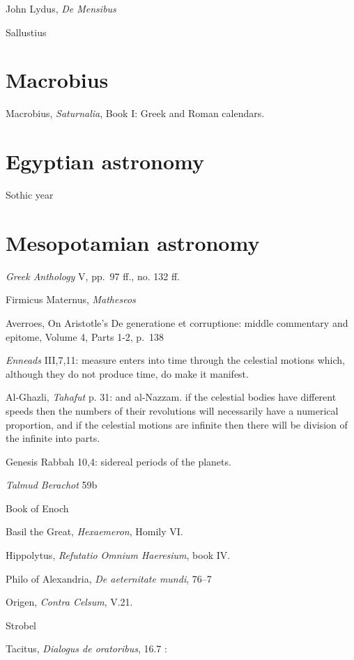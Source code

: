 \documentclass{amsart}
\theoremstyle{definition}
\begin{document}
John Lydus, {\em De Mensibus}

Sallustius



\section{Macrobius}
Macrobius, {\em Saturnalia}, Book I: Greek and Roman calendars.




\section{Egyptian astronomy}
Sothic year



\section{Mesopotamian astronomy}


{\em Greek Anthology} V, pp.~97 ff., no. 132 ff.

Firmicus Maternus, {\em Matheseos} \cite{firmicus}

Averroes, On Aristotle's De generatione et corruptione: middle commentary and epitome, Volume 4, Parts 1-2, p.~138

{\em Enneads} III,7,11: measure enters into time through the celestial motions which, although they do not produce time, do make it manifest.


Al-Ghazli, {\em Tahafut} p. 31: and al-Nazzam. if the celestial bodies have different speeds then the numbers of their revolutions will necessarily have a numerical proportion,
and if the celestial motions are infinite then there will be division of the infinite into parts.

Genesis Rabbah 10,4: sidereal periods of the planets. 

{\em Talmud  Berachot} 59b

Book of Enoch

Basil the Great, {\em Hexaemeron}, Homily VI.

Hippolytus, {\em Refutatio Omnium Haeresium}, book IV.

Philo of Alexandria, {\em De aeternitate mundi}, 76--7

Origen, {\em Contra Celsum}, V.21.

Strobel \cite{strobel}

Tacitus, {\em Dialogus de oratoribus}, 16.7 \cite{tacitus}:
\end{document}
